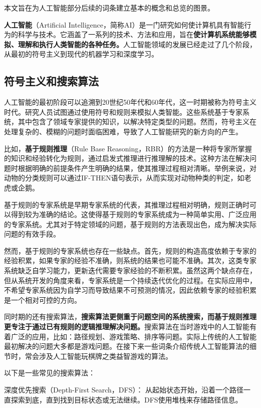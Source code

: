 
本文旨在为人工智能部分后续的词条建立基本的概念和总览的图景。

\textbf{人工智能}（Artificial Intelligence，简称AI）是一门研究如何使计算机具有智能行为的科学与技术。它涵盖了一系列的技术、方法和应用，旨在\textbf{使计算机系统能够模拟、理解和执行人类智能的各种任务。}人工智能领域的发展已经走过了几个阶段，从最初的符号主义到现代的机器学习和深度学习。

\subsection{符号主义和搜索算法}

人工智能的最初阶段可以追溯到20世纪50年代和60年代，这一时期被称为符号主义时代。研究人员试图通过使用符号和规则来模拟人类智能。这些系统基于专家系统，其中包含了领域专家提供的知识，以解决特定类型的问题。然而，符号主义在处理复杂的、模糊的问题时面临困难，导致了人工智能研究的新方向的产生。

比如，\textbf{基于规则推理}（Rule Base Reasoning，RBR）的方法是一种将专家所掌握的知识和经验转化为规则，通过启发式推理进行推理解的技术。这种方法在解决问题时根据明确的前提条件产生明确的结果，使其推理过程相对清晰。举例来说，对动物的分类规则可以通过IF-THEN语句表示，从而实现对动物种类的判定，如老虎或企鹅。

基于规则的专家系统是早期专家系统的代表，其推理过程相对明确，规则正确时可以得到较为准确的结论。这使得基于规则的专家系统成为一种简单实用、广泛应用的专家系统。尤其对于特定领域的问题，基于规则的方法表现出色，成为解决实际问题的有效手段。

然而，基于规则的专家系统也存在一些缺点。首先，规则的构造高度依赖于专家的经验积累，如果专家的经验不准确，则系统的结果也可能不准确。其次，这类专家系统缺乏自学习能力，更新迭代需要专家经验的不断积累。虽然这两个缺点存在，但从系统开发的角度来看，专家系统是一个持续迭代优化的过程。在实际应用中，不希望专家系统因为自学习而导致结果不可预测的情况，因此依赖专家的经验积累是一个相对可控的方向。

同时期的还有搜索算法，\textbf{搜索算法更侧重于问题空间的系统搜索，而基于规则推理更专注于通过已有规则的逻辑推理解决问题。}搜索算法在当时游戏中的人工智能有着广泛的应用，比如：路径规划、游戏策略、排序等问题。实际上传统的人工智能最初解决的问题大多都是游戏问题。在接下来一些词条介绍传统人工智能算法的细节时，常会涉及人工智能玩棋牌之类益智游戏的算法。

以下是一些常见的搜索算法：

深度优先搜索（Depth-First Search，DFS）： 从起始状态开始，沿着一个路径一直探索到底，直到找到目标状态或无法继续。DFS使用堆栈来存储路径信息。

